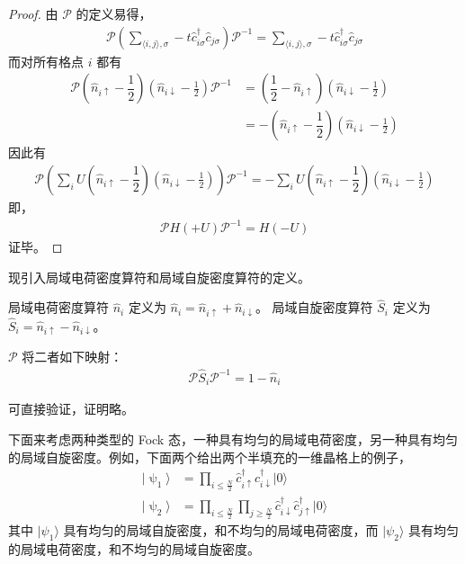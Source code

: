 \begin{proof}
由 $\mathcal{P}$ 的定义易得，
\begin{align}
\mathcal{P}\left(\sum_{\langle i,j\rangle,\sigma} -t\hat{c}_{i\sigma}^{\dagger}\hat{c}_{j\sigma}\right) \mathcal{P}^{-1} = \sum_{\langle i,j\rangle,\sigma} -t\hat{c}_{i\sigma}^{\dagger}\hat{c}_{j\sigma} 
\end{align}
而对所有格点 $i$ 都有
\begin{align}
\mathcal{P}\left(\hat{n}_{i\uparrow}-\dfrac{1}{2}\right)\left(\hat{n}_{i\downarrow}-\frac{1}{2}\right) \mathcal{P}^{-1} &= \left(\dfrac{1}{2}-\hat{n}_{i\uparrow}\right)\left(\hat{n}_{i\downarrow}-\frac{1}{2}\right) \\
&= - \left(\hat{n}_{i\uparrow}-\dfrac{1}{2}\right)\left(\hat{n}_{i\downarrow}-\frac{1}{2}\right)
\end{align}
因此有
\begin{align}
\mathcal{P} \left(\sum_{i} U \left(\hat{n}_{i\uparrow}-\dfrac{1}{2}\right)\left(\hat{n}_{i\downarrow}-\frac{1}{2}\right) \right) \mathcal{P}^{-1} = - \sum_{i} U \left(\hat{n}_{i\uparrow}-\dfrac{1}{2}\right)\left(\hat{n}_{i\downarrow}-\frac{1}{2}\right) 
\end{align}
即，
\begin{align}
\mathcal{P}H(+U)\mathcal{P}^{-1} = H(-U)
\end{align}
证毕。
\end{proof}

现引入局域电荷密度算符和局域自旋密度算符的定义。
\begin{definition}
局域电荷密度算符 $\hat{n}_{i}$ 定义为 $\hat{n}_{i} = \hat{n}_{i\uparrow} + \hat{n}_{i\downarrow}$。
局域自旋密度算符 $\hat{S}_{i}$ 定义为 $\hat{S}_{i}=\hat{n}_{i\uparrow} - \hat{n}_{i\downarrow}$。
\end{definition}

\begin{lemma}\label{lemma2}
$\mathcal{P}$ 将二者如下映射：
\begin{align}
\mathcal{P}\hat{S}_i\mathcal{P}^{-1} = 1 - \hat{n}_i
\end{align}
\end{lemma}
可直接验证，证明略。

下面来考虑两种类型的 Fock 态，一种具有均匀的局域电荷密度，另一种具有均匀的局域自旋密度。例如，下面两个给出两个半填充的一维晶格上的例子，
\begin{align}
|\uppsi_1\rangle &= \prod_{i\leq\frac{N}{2}}\hat{c}_{i\uparrow}^{\dagger}\hat{c}_{i\downarrow}^{\dagger}|0\rangle \\
|\uppsi_2\rangle &= \prod_{i\leq\frac{N}{2}}\prod_{j\geq\frac{N}{2}}\hat{c}_{i\downarrow}^{\dagger}\hat{c}_{j\uparrow}^{\dagger}|0\rangle
\end{align}
其中 $|\psi_1\rangle$ 具有均匀的局域自旋密度，和不均匀的局域电荷密度，而 $|\psi_2\rangle$ 具有均匀的局域电荷密度，和不均匀的局域自旋密度。

